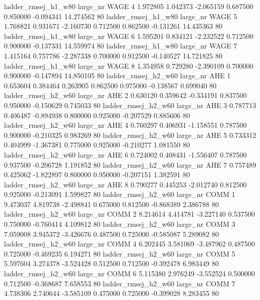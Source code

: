 ladder_rmsej_h1_w80   large_nr     WAGE                 4  1.972805  1.042373  -2.065159 0.687500 0.850000 -0.094341   14.274562 80
ladder_rmsej_h1_w80   large_nr     WAGE                 5  1.768821  0.931671  -2.160730 0.712500 0.862500 -0.131261   14.435363 80
ladder_rmsej_h1_w80   large_nr     WAGE                 6  1.595201  0.834121  -2.232522 0.712500 0.900000 -0.137331   14.559974 80
ladder_rmsej_h1_w80   large_nr     WAGE                 7  1.415164  0.757786  -2.287338 0.700000 0.912500 -0.140527   14.721825 80
ladder_rmsej_h1_w80   large_nr     WAGE                 8  1.354958  0.729280  -2.390109 0.700000 0.900000 -0.147894   14.850105 80
ladder_rmsej_h2_w60   large_nr      AHE                 1  0.653604  0.384464   0.263905 0.862500 0.975000 -0.138567    0.699040 80
ladder_rmsej_h2_w60   large_nr      AHE                 2  0.630120  0.359642  -0.334191 0.837500 0.950000 -0.150629    0.745033 80
ladder_rmsej_h2_w60   large_nr      AHE                 3  0.787713  0.406487  -0.894938 0.800000 0.925000 -0.207529    0.885606 80
ladder_rmsej_h2_w60   large_nr      AHE                 4  0.760297  0.406931  -1.158551 0.787500 0.900000 -0.210325    0.983269 80
ladder_rmsej_h2_w60   large_nr      AHE                 5  0.733312  0.404999  -1.367381 0.775000 0.925000 -0.210277    1.081550 80
ladder_rmsej_h2_w60   large_nr      AHE                 6  0.724002  0.408431  -1.556407 0.787500 0.937500 -0.206728    1.191852 80
ladder_rmsej_h2_w60   large_nr      AHE                 7  0.757489  0.425062  -1.822897 0.800000 0.950000 -0.207151    1.382591 80
ladder_rmsej_h2_w60   large_nr      AHE                 8  0.790277  0.445253  -2.012740 0.812500 0.925000 -0.213091    1.599827 80
ladder_rmsej_h2_w60   large_nr     COMM                 1  9.473037  4.819738  -2.498841 0.675000 0.812500 -0.868389    2.386788 80
ladder_rmsej_h2_w60   large_nr     COMM                 2  8.214614  4.414781  -3.227140 0.537500 0.750000 -0.760414    4.109812 80
ladder_rmsej_h2_w60   large_nr     COMM                 3  7.059008  3.945372  -3.426676 0.487500 0.725000 -0.585087    5.289082 80
ladder_rmsej_h2_w60   large_nr     COMM                 4  6.202445  3.581069  -3.487962 0.487500 0.725000 -0.469235    6.194271 80
ladder_rmsej_h2_w60   large_nr     COMM                 5  5.597604  3.274378  -3.524428 0.512500 0.712500 -0.392478    6.983449 80
ladder_rmsej_h2_w60   large_nr     COMM                 6  5.115380  2.976249  -3.552524 0.500000 0.712500 -0.368687    7.658553 80
ladder_rmsej_h2_w60   large_nr     COMM                 7  4.738306  2.740644  -3.585109 0.475000 0.725000 -0.399028    8.283455 80
